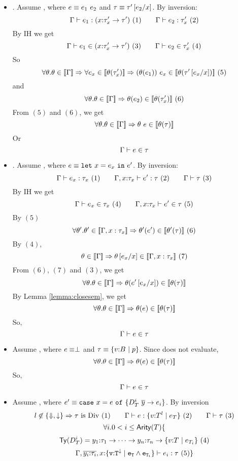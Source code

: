 \begin{enumerate}
\begin{itemize}
\item\rtapp. Assume ,
	where $e\equiv\eapp{e_1}{e_2}$ and $\tau\equiv\tau'\sub{x}{e_2}$.
	By inversion:
	$$
	\hastype{\Gamma}{e_1}{(\tfunref{x}{\tau'_{x}}{\tau'}{v}{e_r})}\ (1)\qquad
	\hastype{\Gamma}{e_2}{\tau'_{x}}\ (2)
	$$
	By IH we get
	$$
	\shastype{\Gamma}{e_1}{(\tfunref{x}{\tau'_{x}}{\tau'}{v}{e_r})}\ (3)\qquad
	\shastype{\Gamma}{e_2}{\tau'_{x}}\ (4)
	$$
	So 
	$$\forall \theta. \iswellformedtheta{\Gamma}{\theta}\Rightarrow
	\forall e_x \in \interp{\thetasub{\theta}{\tau'_x}} \Rightarrow
		\eapp{(\thetasub{\theta}{e_1})}{e_x} \in 
		\interp{\thetasub{\theta}{\tau'\sub{x}{e_x}}}
	\ (5)$$
	and
	$$\forall \theta. \iswellformedtheta{\Gamma}{\theta}\Rightarrow
		\thetasub{\theta}{e_2} \in 
		\interp{\thetasub{\theta}{\tau'_x}}
	\ (6)$$
%
	From $(5)$ and $(6)$, we get
	$$\forall \theta. \iswellformedtheta{\Gamma}{\theta}\Rightarrow
		\theta\ e \in \interp{\thetasub{\theta}{\tau}}
	$$
	Or $$\shastype{\Gamma}{e}{\tau}$$

\item\rtlet. Assume , 
	where $e \equiv\elet{x}{e_x}{e'}$.
	By inversion:
	$$
	\hastype{\Gamma}{e_x}{\tau_{x}}\ (1) \qquad
	\hastype{\Gamma,x\colon\tau_x}{e'}{\tau}\ (2)\qquad
	\iswellformed{\Gamma}{\tau}\ (3)
	$$
	By IH we get
	$$
	\shastype{\Gamma}{e_x}{\tau_{x}}\ (4) \qquad
	\shastype{\Gamma,x\colon\tau_x}{e'}{\tau}\ (5)
	$$
	By $(5)$
	$$\forall \theta'. \iswellformedtheta{\Gamma, x:\tau_x}{\theta'}\Rightarrow
		\thetasub{\theta'}{e'} \in \interp{\thetasub{\theta'}{\tau}}
		\ (6)
	$$
	By $(4)$, 
	$$
	 	\iswellformedtheta{\Gamma}{\theta}
		\Rightarrow 
		\iswellformedtheta{\Gamma, x:\tau_x}{\theta\sub{x}{e_x}}
	\ (7)$$
	From $(6)$, $(7)$ and $(3)$, we get
	$$\forall \theta. \iswellformedtheta{\Gamma}{\theta}\Rightarrow
		\thetasub{\theta}{e'\sub{x}{e_x}} \in \interp{\thetasub{\theta}{\tau}}
	$$
	By Lemma \ref{lemma:closesem}, we get
	$$\forall \theta. \iswellformedtheta{\Gamma}{\theta}\Rightarrow
		\thetasub{\theta}{e} \in \interp{\thetasub{\theta}{\tau}}
	$$
	So, $$\shastype{\Gamma}{e}{\tau}$$
\item\rtbot Assume , 
	where $e \equiv\ebot$ and $\tau \equiv \tref{v}{B}{}{p}$.
	Since \ebot does not evaluate, 
	$$\forall \theta. \iswellformedtheta{\Gamma}{\theta}\Rightarrow
		\thetasub{\theta}{e} \in \interp{\thetasub{\theta}{\tau}}
	$$
	So, $$\shastype{\Gamma}{e}{\tau}$$

\item\rtcase Assume , 
	where $e' \equiv \ecase{e}{D^i_T}{\overline{y}}{e_i}{x}$.
	By inversion
$$
	l \not \in \{\finite, \trivial\} \Rightarrow \tau \ \text{is}\ \Div\ (1)\qquad
	\hastype{\Gamma}{e}{\tref{v}{T}{l}{e_T}} \ (2)\qquad
	 \iswellformed{\Gamma}{\tau}\ (3)
$$
$$
\forall i. 0 < i \leq \arity{T}\{
$$
$$
	\constty{D^i_T} = \tfun{y_1}{\tau_1}{\dots\rightarrow\tfun{y_n}{\tau_n}{\tref{v}{T}{}{e_{T_i}}}}\ (4)
$$
$$
		\hastype{\Gamma,  
				\overline{y_i\colon \tau_i},
				x\colon\tlref{v}{T}{\restrictdecidable{\trivial}
				{\addtechnical{}{\ltrivial}}
				}{e_T \land e_{T_i}}}{e_i}{\tau}\ (5) \}
$$


\end{itemize}
\end{enumerate}
